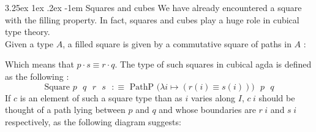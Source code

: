 \documentclass{report}
\makeatletter
\renewcommand\paragraph{\@startsection{paragraph}{5}{\z@}%
  {3.25ex \@plus1ex \@minus.2ex}%
  {-1em}%
  {\normalfont\normalsize\bfseries}}
\makeatother
\begin{document}
\paragraph{Squares and cubes} We have already encountered a square with the filling property. In fact, squares and cubes play a huge role in cubical type theory. \\
Given a type $A$, a filled square is given by a commutative square of paths in $A$ : 
\begin{center}
    \label{fig:squarecommute}
\end{center}
Which means that $\boxed{p \cdot s \equiv r \cdot q}$. The type of such squares in cubical agda is defined as the following : 
$$\text{Square $p$ $q$ $r$ $s$ $:\equiv$ PathP $\big(\lambda i \mapsto (r(i) \equiv s(i))\big)$ $p$ $q$}$$
If $c$ is an element of such a square type than as $i$ varies along $I$, $c \hspace{3pt} i$ should be thought of a path lying between $p$ and $q$ and whose boundaries are $r \hspace{3pt} i$ and $s \hspace{3pt} i$ respectively, as the following diagram suggests:
\begin{center}
\end{center}
\end{document}
